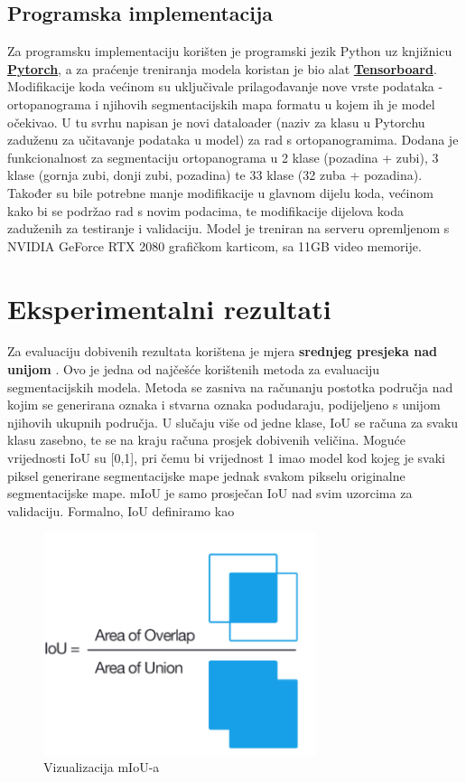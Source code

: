 \subsection{Programska implementacija}
Za programsku implementaciju korišten je programski jezik Python uz knjižnicu \textbf{\href{https://pytorch.org/}{Pytorch}}, a za praćenje treniranja modela koristan je bio alat \textbf{\href{https://www.tensorflow.org/tensorboard}{Tensorboard}}. Modifikacije koda većinom su uključivale prilagođavanje nove vrste podataka - ortopanograma i njihovih segmentacijskih mapa formatu u kojem ih je model očekivao. U tu svrhu napisan je novi dataloader (naziv za klasu u Pytorchu zaduženu za učitavanje podataka u model) za rad s ortopanogramima. Dodana je funkcionalnost za segmentaciju ortopanograma u 2 klase (pozadina + zubi), 3 klase (gornja zubi, donji zubi, pozadina) te 33 klase (32 zuba + pozadina). Također su bile potrebne manje modifikacije u glavnom dijelu koda, većinom kako bi se podržao rad s novim podacima, te modifikacije dijelova koda zaduženih za testiranje i validaciju. Model je treniran na serveru opremljenom s NVIDIA GeForce RTX 2080 grafičkom karticom, sa 11GB video memorije.
\section{Eksperimentalni rezultati} 

Za evaluaciju dobivenih rezultata korištena je mjera \textbf{srednjeg presjeka nad unijom} . Ovo je jedna od najčešće korištenih metoda za evaluaciju segmentacijskih modela. Metoda se zasniva na računanju postotka područja nad kojim se generirana oznaka i stvarna oznaka podudaraju, podijeljeno s unijom njihovih ukupnih područja. U slučaju više od jedne klase, IoU se računa za svaku klasu zasebno, te se na kraju računa prosjek dobivenih veličina. Moguće vrijednosti IoU su [0,1], pri čemu bi vrijednost 1 imao model kod kojeg je svaki piksel generirane segmentacijske mape jednak svakom pikselu originalne segmentacijske mape. mIoU je samo prosječan IoU nad svim uzorcima za validaciju. Formalno, IoU definiramo kao

\begin{figure}[htb]
\centering
\includegraphics[width=8cm]{slike/miou.png}
\caption{Vizualizacija mIoU-a \citep{miou}}
\label{fig:fer-logo}
\end{figure}
\textbf{}



